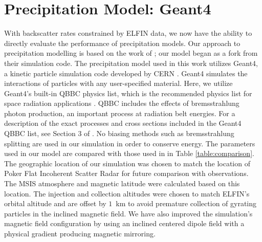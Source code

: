 \documentclass[draft]{agujournal2019}
\begin{document}
\section{Precipitation Model: Geant4}
With backscatter rates constrained by ELFIN data, we now have the ability to directly evaluate the performance of precipitation models. Our approach to precipitation modelling is based on the work of ; our model began as a fork from their simulation code. The precipitation model used in this work utilizes Geant4, a kinetic particle simulation code developed by CERN \cite{agostinelli2003}. Geant4 simulates the interactions of particles with any user-specified material. Here, we utilize Geant4's built-in QBBC physics list, which is the recommended physics list for space radiation applications \cite{ivantchenko2012}. QBBC includes the effects of bremsstrahlung photon production, an important process at radiation belt energies. For a description of the exact processes and cross sections included in the Geant4 QBBC list, see Section 3 of . No biasing methods such as bremsstrahlung splitting are used in our simulation in order to conserve energy. The parameters used in our model are compared with those used in  in Table \ref{table:comparison}. The geographic location of our simulation was chosen to match the location of Poker Flat Incoherent Scatter Radar for future comparison with observations. The MSIS atmosphere and magnetic latitude were calculated based on this location. The injection and collection altitudes were chosen to match ELFIN's orbital altitude and are offset by $1$~km to avoid premature collection of gyrating particles in the inclined magnetic field. We have also improved the simulation's magnetic field configuration by using an inclined centered dipole field with a physical gradient producing magnetic mirroring.
\end{document}

